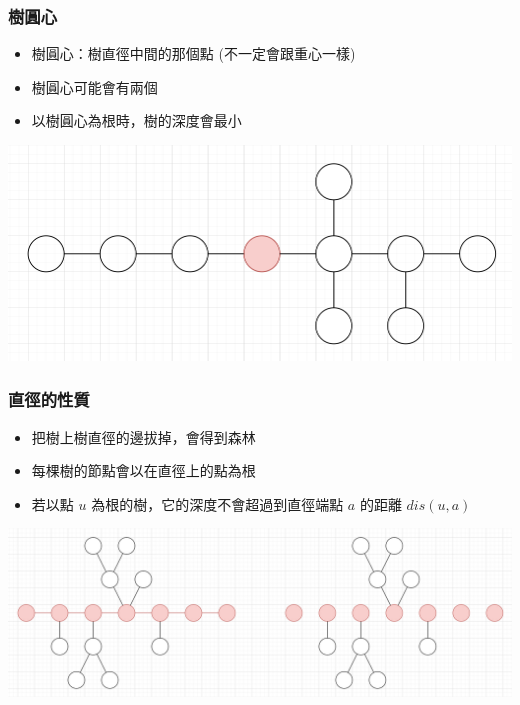 \documentclass[aspectratio=169]{beamer}
\begin{document}
    \begin{frame}
        \frametitle{樹圓心}
        \begin{itemize}
            \item 樹圓心：樹直徑中間的那個點 (不一定會跟重心一樣)
            \item 樹圓心可能會有兩個
            \item 以樹圓心為根時，樹的深度會最小
        \end{itemize}
        \begin{center}
            \includegraphics[scale=0.25]{images/tree_center.png}
        \end{center}
    \end{frame}
    
    \begin{frame}
        \frametitle{直徑的性質}
        \begin{itemize}
            \item 把樹上樹直徑的邊拔掉，會得到森林
            \item 每棵樹的節點會以在直徑上的點為根
            \item 若以點 $u$ 為根的樹，它的深度不會超過到直徑端點 $a$ 的距離 $dis(u,a)$
        \end{itemize}
        
        \begin{center}
            \includegraphics[scale=0.4]{images/tree_diameter_property.png}
        \end{center}
    \end{frame}
    
\end{document}
